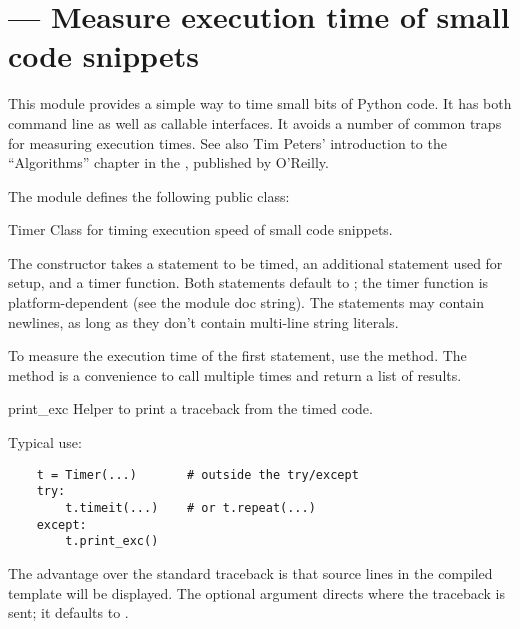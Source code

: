 \section{ ---
         Measure execution time of small code snippets}



This module provides a simple way to time small bits of Python code.
It has both command line as well as callable interfaces.  It avoids a
number of common traps for measuring execution times.  See also Tim
Peters' introduction to the ``Algorithms'' chapter in the
, published by O'Reilly.

The module defines the following public class:

\begin{classdesc}{Timer}{}
Class for timing execution speed of small code snippets.

The constructor takes a statement to be timed, an additional statement
used for setup, and a timer function.  Both statements default to
; the timer function is platform-dependent (see the
module doc string).  The statements may contain newlines, as long as
they don't contain multi-line string literals.

To measure the execution time of the first statement, use the
 method.  The  method is a
convenience to call  multiple times and return a list
of results.
\end{classdesc}

\begin{methoddesc}{print_exc}{}
Helper to print a traceback from the timed code.

Typical use:

\begin{verbatim}
    t = Timer(...)       # outside the try/except
    try:
        t.timeit(...)    # or t.repeat(...)
    except:
        t.print_exc()
\end{verbatim}

The advantage over the standard traceback is that source lines in the
compiled template will be displayed.
The optional  argument directs where the traceback is sent;
it defaults to .
\end{methoddesc}

